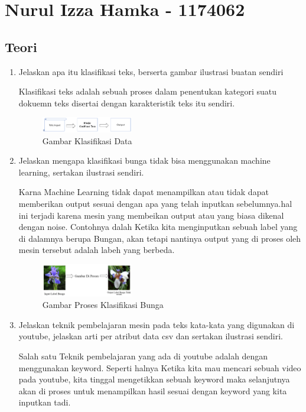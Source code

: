 \section{Nurul Izza Hamka - 1174062}
\subsection{Teori}
\begin{enumerate}

\item Jelaskan apa itu klasifikasi teks, berserta gambar ilustrasi buatan sendiri

Klasifikasi teks adalah sebuah proses dalam penentukan kategori suatu dokuemn teks disertai dengan karakteristik teks itu sendiri. 

	\begin{figure}[H]
	\centering
		\includegraphics[width=4cm]{figures/1174062/4/Teori/No1.png}
		\caption{Gambar Klasifikasi Data}
	\end{figure}
	
\item Jelaskan mengapa klasifikasi bunga tidak bisa menggunakan machine learning, sertakan ilustrasi sendiri.

Karna Machine Learning tidak dapat menampilkan atau tidak dapat memberikan output sesuai dengan apa yang telah inputkan sebelumnya.hal ini terjadi karena mesin yang membeikan output atau yang biasa dikenal dengan noise. Contohnya dalah Ketika kita menginputkan sebuah label yang di dalamnya berupa Bungan, akan tetapi nantinya output yang di proses oleh mesin tersebut adalah labeh yang berbeda. 

	\begin{figure}[H]
	\centering
		\includegraphics[width=4cm]{figures/1174062/4/Teori/No2.png}
		\caption{Gambar Proses Klasifikasi Bunga}
	\end{figure}
	
\item Jelaskan teknik pembelajaran mesin pada teks kata-kata yang digunakan di youtube, jelaskan arti per atribut data csv dan sertakan ilustrasi sendiri.

Salah satu Teknik pembelajaran yang ada di youtube adalah dengan menggunakan keyword. Seperti halnya Ketika kita mau mencari sebuah video pada youtube, kita tinggal mengetikkan sebuah keyword maka selanjutnya akan di proses untuk menampilkan hasil sesuai dengan keyword yang kita inputkan tadi. 


\end{enumerate}
